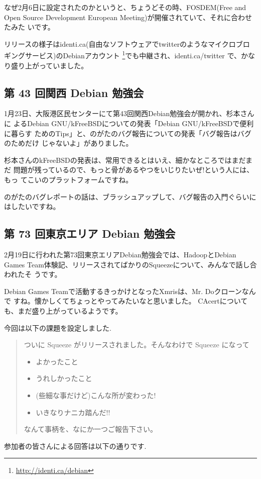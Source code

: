 \documentclass[mingoth,a4paper]{jsarticle}
\begin{document}
なぜ2月6日に設定されたのかというと、ちょうどその時、FOSDEM(Free and Open
Source Development European Meeting)が開催されていて、それに合わせたみた
いです。

リリースの様子はidenti.ca(自由なソフトウェアでtwitterのようなマイクロブロ
ギングサービス)のDebianアカウント
\footnote{\url{http://identi.ca/debian}}でも中継され、identi.ca/twitter
で、かなり盛り上がっていました。

\subsection{第 43 回関西 Debian 勉強会}

1月23日、大阪港区民センターにて第43回関西Debian勉強会が開かれ、杉本さんに
よるDebian GNU/kFreeBSDについての発表「Debian GNU/kFreeBSDで便利に暮らす
ためのTips」と、のがたのバグ報告についての発表「バグ報告はバグのためだけ
じゃないよ」がありました。

杉本さんのkFreeBSDの発表は、常用できるとはいえ、細かなところではまだまだ
問題が残っているので、もっと骨があるやつをいじりたいぜ!という人には、もっ
てこいのプラットフォームですね。

のがたのバグレポートの話は、ブラッシュアップして、バグ報告の入門ぐらいに
はしたいですね。

\subsection{第 73 回東京エリア Debian 勉強会}

2月19日に行われた第73回東京エリアDebian勉強会では、HadoopとDebian Games
Team体験記、リリースされてばかりのSqueezeについて、みんなで話し合われたそ
うです。

Debian Games Teamで活動するきっかけとなったXmrisは、Mr. Doクローンなんで
すね。懐かしくてちょっとやってみたいなと思いました。
CAcertについても、まだ盛り上がっているようです。

\clearpage


今回は以下の課題を設定しました.
%
\begin{quote}
    \begin{screen}
     ついに Squeeze がリリースされました。そんなわけで Squeeze になって
     \begin{itemize}
      \item よかったこと
      \item うれしかったこと
      \item (些細な事だけど)こんな所が変わった!
      \item いきなりナニカ踏んだ!!
     \end{itemize}
     なんて事柄を、なにか一つご報告下さい。
    \end{screen}
 \end{quote}
 参加者の皆さんによる回答は以下の通りです.
\end{document}

